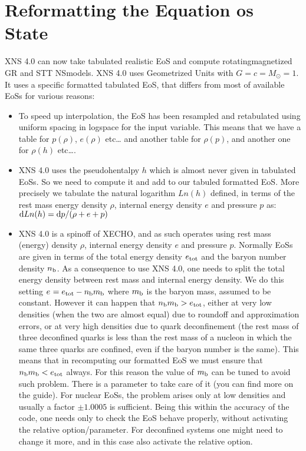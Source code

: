\documentclass[letterpaper,10pt,english]{sphinxmanual}
\begin{document}
\sphinxstepscope


\chapter{Reformatting the Equation os State}
\label{\detokenize{eos:reformatting-the-equation-os-state}}\label{\detokenize{eos::doc}}
\sphinxAtStartPar
XNS 4.0 can now take tabulated realistic EoS and compute rotating\sphinxhyphen{}magnetized GR and STT NS\sphinxhyphen{}models. XNS 4.0 uses Geometrized Units with \(G=c=M_\odot=1\). It uses a specific formatted tabulated EoS, that differs from most of available EoSs for various reasons:
\begin{itemize}
\item {} 
\sphinxAtStartPar
To speed up interpolation, the EoS has been resampled and re\sphinxhyphen{}tabulated using uniform spacing in log\sphinxhyphen{}space for the input variable. This means that we have a table for \(p(\rho)\), \(e(\rho)\) etc…  and another table for \(\rho(p)\), and another one for \(\rho(h)\) etc….

\item {} 
\sphinxAtStartPar
XNS 4.0 uses the pseudo\sphinxhyphen{}hentalpy \(h\) which is almost never given in tabulated EoSs. So we need to compute it and add to our tabuled formatted EoS. More precisely we tabulate the natural logarithm \(Ln(h)\) defined, in terms of the rest mass energy density \(\rho\), internal energy density \(e\) and pressure \(p\) as: \({\rm d} Ln(h) = {\rm d}p/(\rho +e +p)\)

\item {} 
\sphinxAtStartPar
XNS 4.0  is a spin\sphinxhyphen{}off of X\sphinxhyphen{}ECHO, and as such operates using rest mass (energy) density \(\rho\), internal energy density \(e\) and pressure \(p\). Normally EoSs are given in terms of the total energy density \(e_{\rm tot}\) and the baryon number density \(n_{\rm b}\). As a consequence to use XNS 4.0, one needs to split the total energy density between rest mass and internal energy density. We do this setting \(e_{\rm} = e_{\rm tot}- n_{\rm b} m_{\rm b} \) where \(m_{\rm b}\) is the baryon mass, assumed to be constant. However it can happen that \(n_{\rm b} m_{\rm b} > e_{\rm tot}\), either at very low densities (when the two are almost equal) due to round\sphinxhyphen{}off and approximation errors, or at very high densities due to quark deconfinement (the rest mass of three deconfined quarks is less than the rest mass of a nucleon in which the same three quarks are confined, even if the baryon number is the same).  This means that in recomputing our formatted EoS we must ensure that \(n_{\rm b} m_{\rm b} < e_{\rm tot}\) always. For this reason the value of \(m_{\rm b}\) can be tuned to avoid such problem. There is a parameter  to take care of it (you can find more on the guide). For nuclear EoSs, the problem arises only at low densities and usually a factor \(\pm 1.0005\) is sufficient. Being this within the accuracy of the code,  one needs only to check the EoS behave properly, without activating the relative option/parameter.  For deconfined systems one might need to change it more, and in this case also activate the relative option.


\end{itemize}
\end{document}
